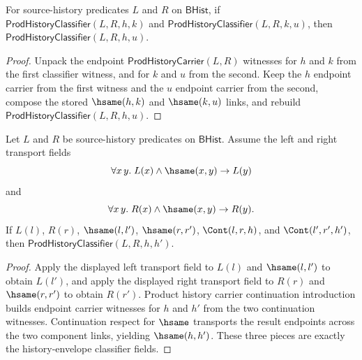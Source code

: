 \begin{theorem}
\label{thm:prod-history-classifier-transitivity}
For source-history predicates $L$ and $R$ on $\mathsf{BHist}$, if $\mathsf{ProdHistoryClassifier}(L,R,h,k)$ and $\mathsf{ProdHistoryClassifier}(L,R,k,u)$, then $\mathsf{ProdHistoryClassifier}(L,R,h,u)$.
\end{theorem}
\begin{proof}
Unpack the endpoint $\mathsf{ProdHistoryCarrier}(L,R)$ witnesses for $h$ and $k$ from the first classifier witness, and for $k$ and $u$ from the second. Keep the $h$ endpoint carrier from the first witness and the $u$ endpoint carrier from the second, compose the stored $\hsame(h,k)$ and $\hsame(k,u)$ links, and rebuild $\mathsf{ProdHistoryClassifier}(L,R,h,u)$.
\end{proof}

\begin{theorem}
\label{thm:prod-history-classifier-cont-congr}
Let $L$ and $R$ be source-history predicates on $\mathsf{BHist}$. Assume the left and right transport fields
$$
\forall x\,y.\; L(x)\land\hsame(x,y)\to L(y)
$$
and
$$
\forall x\,y.\; R(x)\land\hsame(x,y)\to R(y).
$$
If $L(l)$, $R(r)$, $\hsame(l,l')$, $\hsame(r,r')$, $\Cont(l,r,h)$, and $\Cont(l',r',h')$, then
$\mathsf{ProdHistoryClassifier}(L,R,h,h')$.
\end{theorem}
\begin{proof}
Apply the displayed left transport field to $L(l)$ and $\hsame(l,l')$ to obtain $L(l')$, and apply the displayed right transport field to $R(r)$ and $\hsame(r,r')$ to obtain $R(r')$. Product history carrier continuation introduction builds endpoint carrier witnesses for $h$ and $h'$ from the two continuation witnesses. Continuation respect for $\hsame$ transports the result endpoints across the two component links, yielding $\hsame(h,h')$. These three pieces are exactly the history-envelope classifier fields.
\end{proof}
